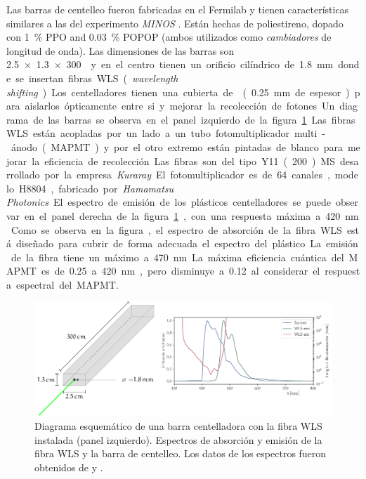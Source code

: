 Las barras de centelleo fueron fabricadas en el Fermilab y tienen características similares a las del experimento \emph{MINOS} \cite{knitta04}. Están hechas de poliestireno, dopado con \SI{1}{\percent} PPO and \SI{0.03}{\percent} POPOP (ambos utilizados como \emph{cambiadores} de longitud de onda). Las dimensiones de las barras son \SI[product-units=power]{2.5x1.3x300}{\cm\cubic} y en el centro tienen un orificio cilíndrico de \SI{1.8}{\mm} donde se insertan fibras WLS (\emph{wavelength shifting}). Los centelladores tienen una cubierta de  (\SI{0.25}{\mm} de espesor) para aislarlos ópticamente entre si y mejorar la recolección de fotones. Un diagrama de las barras se observa en el panel izquierdo de la figura \ref{fig:scibar-optics}.

Las fibras WLS están acopladas por un lado a un tubo fotomultiplicador multi-ánodo (MAPMT) y por el otro extremo están pintadas de blanco para mejorar la eficiencia de recolección. Las fibras son del tipo Y11(200)MS desarrollado por la empresa \emph{Kuraray}. El fotomultiplicador es de \num{64} canales, modelo H8804, fabricado por \emph{Hamamatsu Photonics}.

El espectro de emisión de los plásticos centelladores se puede observar en el panel derecha de la figura \ref{fig:scibar-optics}, con una respuesta máxima a \SI{420}{\nano\metre}. Como se observa en la figura, el espectro de absorción de la fibra WLS está diseñado para cubrir de forma adecuada el espectro del plástico. La emisión de la fibra tiene un máximo a \SI{470}{\nano\metre}. La máxima eficiencia cuántica del MAPMT es de \num{0.25} a \SI{420}{\nano\metre}, pero disminuye a \num{0.12} al considerar el respuesta espectral del MAPMT.

\begin{figure}
        \centering
        \includegraphics[width=\textwidth]{scibar.pdf}
        \caption{Diagrama esquemático de una barra centelladora con la fibra WLS instalada (panel izquierdo). Espectros de absorción y emisión de la fibra WLS y la barra de centelleo. Los datos de los espectros fueron obtenidos de \cite{kikawa14} y \cite{dietz16}.}
        \label{fig:scibar-optics}
\end{figure}

